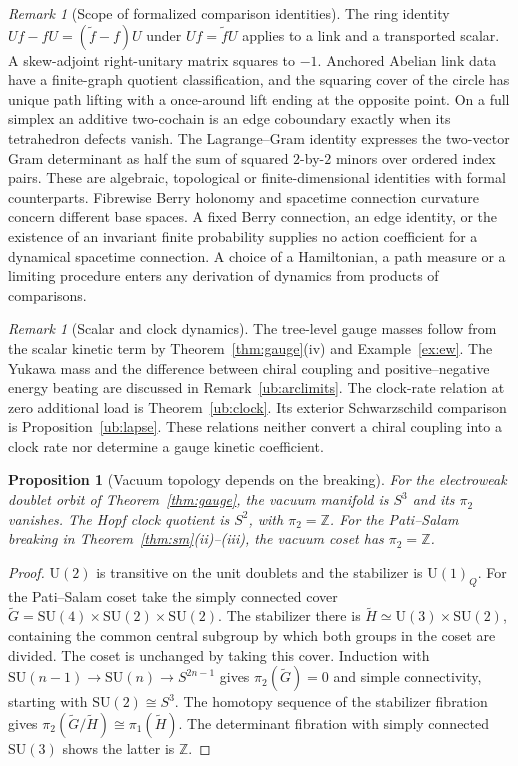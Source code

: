 \documentclass[aps,pra,onecolumn,superscriptaddress,nofootinbib,10pt]{revtex4-2}
\newtheorem{proposition}[theorem]{Proposition}
\theoremstyle{definition}
\theoremstyle{remark}
\newtheorem{remark}[theorem]{Remark}
\newcommand{\SU}{\mathrm{SU}}
\begin{document}
\begin{remark}[Scope of formalized comparison identities]\label{cr:formal}
The ring identity $Uf-fU=(\widetilde f-f)U$ under
$Uf=\widetilde f U$ applies to a link and a transported scalar.
A skew-adjoint right-unitary matrix squares to $-1$.
Anchored Abelian link data have a finite-graph quotient
classification, and the squaring cover of the circle has unique
path lifting with a once-around lift ending at the opposite
point. On a full simplex an additive two-cochain is an edge
coboundary exactly when its tetrahedron defects vanish.
The Lagrange--Gram identity expresses the two-vector Gram
determinant as half the sum of squared $2$-by-$2$ minors over
ordered index pairs.
These are algebraic, topological or finite-dimensional identities
with formal counterparts. Fibrewise Berry holonomy and
spacetime connection curvature concern different base spaces.
A fixed Berry connection, an edge identity, or the existence
of an invariant finite probability supplies no action coefficient
for a dynamical spacetime connection. A choice of a Hamiltonian,
a path measure or a limiting procedure enters any derivation
of dynamics from products of comparisons.
\end{remark}

\begin{remark}[Scalar and clock dynamics]\label{cr:boundary}
The tree-level gauge masses follow from the scalar kinetic term
by Theorem~\ref{thm:gauge}(iv) and Example~\ref{ex:ew}.
The Yukawa mass and the difference between chiral coupling and
positive--negative energy beating are discussed in
Remark~\ref{ub:arclimits}. The clock-rate relation at zero
additional load is Theorem~\ref{ub:clock}. Its exterior
Schwarzschild comparison is Proposition~\ref{ub:lapse}.
These relations neither convert a chiral coupling into a clock
rate nor determine a gauge kinetic coefficient.
\end{remark}

\begin{proposition}[Vacuum topology depends on the breaking]\label{cr:topology}
For the electroweak doublet orbit of Theorem~\ref{thm:gauge},
the vacuum manifold is $S^3$ and its $\pi_2$ vanishes. The
Hopf clock quotient is $S^2$, with $\pi_2=\mathbb Z$. For the
Pati--Salam breaking in Theorem~\ref{thm:sm}(ii)--(iii),
the vacuum coset has $\pi_2=\mathbb Z$.
\end{proposition}
\begin{proof}
$\mathrm U(2)$ is transitive on the unit doublets and the
stabilizer is $\mathrm U(1)_Q$. For the Pati--Salam coset take
the simply connected cover $\widetilde G=\SU(4)\times
\SU(2)\times\SU(2)$. The stabilizer there is
$\widetilde H\simeq\mathrm U(3)\times\SU(2)$, containing
the common central subgroup by which both groups in the coset
are divided. The coset is unchanged by taking this cover.
Induction with $\SU(n-1)\to\SU(n)\to
S^{2n-1}$ gives $\pi_2(\widetilde G)=0$ and simple connectivity,
starting with $\SU(2)\cong S^3$. The homotopy sequence
of the stabilizer fibration gives
$\pi_2(\widetilde G/\widetilde H)\cong\pi_1(\widetilde H)$.
The determinant fibration with simply connected
$\SU(3)$ shows the latter is $\mathbb Z$.
\end{proof}
\end{document}
